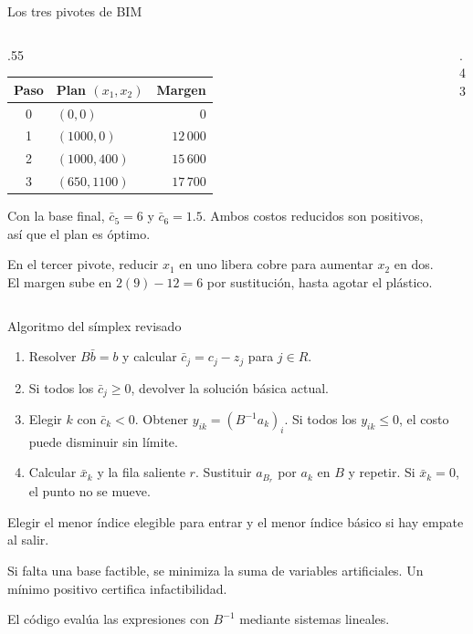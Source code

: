 \documentclass[aspectratio=169,12pt]{beamer}
\newcommand{\figuraPL}[2]{%
  \resizebox{!}{#2}{}}
\begin{document}
\begin{frame}{Los tres pivotes de BIM}
\begin{columns}[c,onlytextwidth]
\begin{column}{.55\textwidth}
\begin{tabular}{clr}
\toprule
Paso & Plan $(x_1,x_2)$ & Margen\\
\midrule
0 & $(0,0)$ & $0$\\
1 & $(1000,0)$ & $12\,000$\\
2 & $(1000,400)$ & $15\,600$\\
3 & $(650,1100)$ & $17\,700$\\
\bottomrule
\end{tabular}
\medskip

Con la base final, $\bar c_5=6$ y $\bar c_6=1.5$.
Ambos costos reducidos son positivos, así que el plan es óptimo.
\medskip

En el tercer pivote, reducir $x_1$ en uno libera cobre para aumentar
$x_2$ en dos. El margen sube en $2(9)-12=6$ por sustitución,
hasta agotar el plástico.
\end{column}
\begin{column}{.43\textwidth}
\centering
\figuraPL{pl_bim_pivotes}{5.35cm}
\end{column}
\end{columns}
\end{frame}

\begin{frame}{Algoritmo del símplex revisado}
\begin{enumerate}
\item Resolver $B\bar b=b$ y calcular $\bar c_j=c_j-z_j$ para $j\in R$.
\item Si todos los $\bar c_j\ge0$, devolver la solución básica actual.
\item Elegir $k$ con $\bar c_k<0$. Obtener $y_{ik}=(B^{-1}a_k)_i$.
      Si todos los $y_{ik}\le0$, el costo puede disminuir sin límite.
\item Calcular $\bar x_k$ y la fila saliente $r$. Sustituir $a_{B_r}$
      por $a_k$ en $B$ y repetir. Si $\bar x_k=0$, el punto no se mueve.
\end{enumerate}
\medskip

\hyperlink{teoria-terminacion}{} Elegir el menor índice elegible para entrar
y el menor índice básico si hay empate al salir.
\medskip

\hyperlink{teoria-fase1}{} Si falta una base factible, se minimiza la suma de
variables artificiales. Un mínimo positivo certifica infactibilidad.
\medskip

El código evalúa las expresiones con $B^{-1}$ mediante sistemas lineales.
\end{frame}
\end{document}
